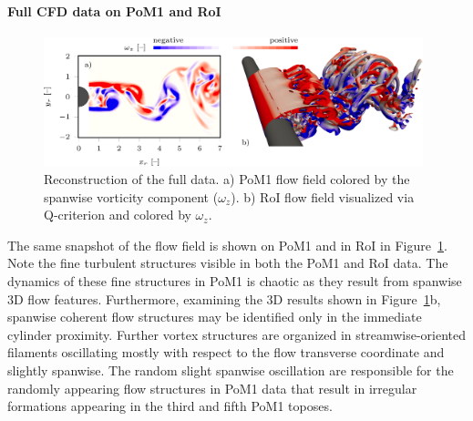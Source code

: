 {{{{\paragraph{Full CFD data on PoM1 and RoI}
\begin{figure}[htbp]
    \centering
    \includegraphics[width=0.98\textwidth]{02_images/00_export/figure23.png}
    \caption{Reconstruction of the full data. a) PoM1 flow field colored by the spanwise vorticity component ($\omega_{z}$). b) RoI flow field visualized via Q-criterion and colored by $\omega_{z}$.}
    \label{fig:fullRec}
\end{figure}
The same snapshot of the flow field is shown on PoM1 and in RoI in Figure~\ref{fig:fullRec}. Note the fine turbulent structures visible in both the PoM1 and RoI data. The dynamics of these fine structures in PoM1 is chaotic as they result from spanwise 3D flow features. Furthermore, examining the 3D results shown in Figure~\ref{fig:fullRec}b, spanwise coherent flow structures may be identified only in the immediate cylinder proximity. Further vortex structures are organized in streamwise-oriented filaments oscillating mostly with respect to the flow transverse coordinate and slightly spanwise. The random slight spanwise oscillation are responsible for the randomly appearing flow structures in PoM1 data that result in irregular formations appearing in the third and fifth PoM1 toposes.

}}}}
